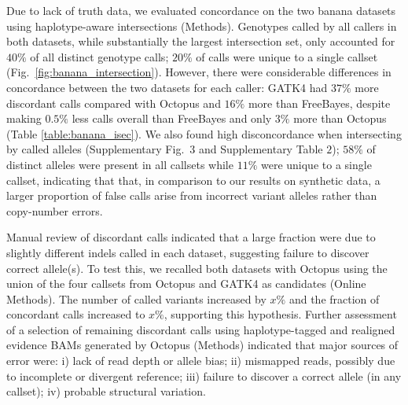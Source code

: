 \documentclass[notitlepage, twocolumn, 10pt]{article}
\begin{document}
Due to lack of truth data, we evaluated concordance on the two banana datasets using haplotype-aware intersections (Methods). Genotypes called by all callers in both datasets, while substantially the largest intersection set, only accounted for $40\%$ of all distinct genotype calls; $20\%$ of calls were unique to a single callset (Fig.\ \ref{fig:banana_intersection}). However, there were considerable differences in concordance between the two datasets for each caller: GATK4 had $37\%$ more discordant calls compared with Octopus and $16\%$ more than FreeBayes, despite making $0.5\%$ less calls overall than FreeBayes and only $3\%$ more than Octopus (Table \ref{table:banana_isec}). We also found high disconcordance when intersecting by called alleles (Supplementary Fig.\ $3$ and Supplementary Table $2$); $58\%$ of distinct alleles were present in all callsets while $11\%$ were unique to a single callset, indicating that that, in comparison to our results on synthetic data, a larger proportion of false calls arise from incorrect variant alleles rather than copy-number errors.

Manual review of discordant calls indicated that a large fraction were due to slightly different indels called in each dataset, suggesting failure to discover correct allele(s). To test this, we recalled both datasets with Octopus using the union of the four callsets from Octopus and GATK4 as candidates (Online Methods). The number of called variants increased by $x\%$ and the fraction of concordant calls increased to $x\%$, supporting this hypothesis. Further assessment of a selection of remaining discordant calls using haplotype-tagged and realigned evidence BAMs generated by Octopus (Methods) indicated that major sources of error were: i) lack of read depth or allele bias; ii) mismapped reads, possibly due to incomplete or divergent reference; iii) failure to discover a correct allele (in any callset); iv) probable structural variation. 

\begin{table}[bp]
%
\end{table}
\end{document}
